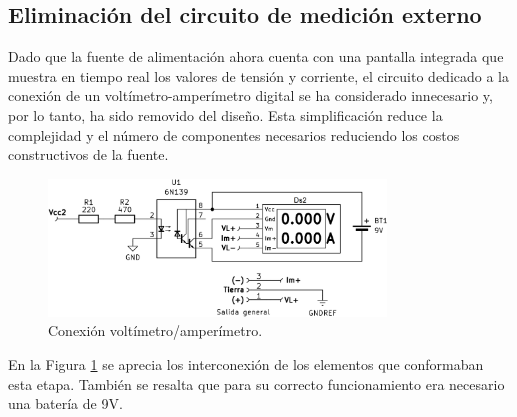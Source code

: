 \subsection{Eliminación del circuito de medición externo}
Dado que la fuente de alimentación ahora cuenta con una pantalla integrada que muestra en tiempo real los valores de tensión y corriente, el circuito dedicado a la conexión de un voltímetro-amperímetro digital se ha considerado innecesario y, por lo tanto, ha sido removido del diseño. Esta simplificación reduce la complejidad y el número de componentes necesarios reduciendo los costos constructivos de la fuente.
\begin{figure}[H]
    \centering
    \includegraphics[width=0.8\textwidth]{./imagenes/voltimetro_amperimetro.png}
    \caption{Conexión voltímetro/amperímetro.}
    \label{F:voltimetro_amperimetro}
\end{figure}
En la Figura \ref{F:voltimetro_amperimetro} se aprecia los interconexión de los elementos que conformaban esta etapa. También se resalta que para su correcto funcionamiento era necesario una batería de 9V.

